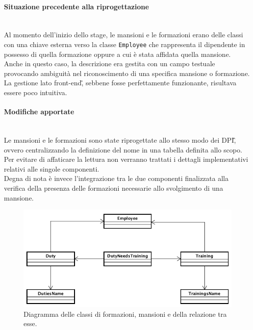 \paragraph*{Situazione precedente alla riprogettazione} \mbox{} \\
	Al momento dell'inizio dello stage, le mansioni e le formazioni erano delle classi con una chiave esterna verso la classe \texttt{Employee} che rappresenta il dipendente in possesso di quella formazione oppure a cui è stata affidata quella mansione.\\
	Anche in questo caso, la descrizione era gestita con un campo testuale provocando ambiguità nel riconoscimento di una specifica mansione o formazione.\\
	La gestione lato \gls{front-end}\G, sebbene fosse perfettamente funzionante, risultava essere poco intuitiva.
	
\paragraph*{Modifiche apportate} \mbox{} \\
Le mansioni e le formazioni sono state riprogettate allo stesso modo dei \gls{DPI}\G, ovvero centralizzando la definizione del nome in una tabella definita allo scopo. \\
Per evitare di affaticare la lettura non verranno trattati i dettagli implementativi relativi alle singole componenti. \\
Degna di nota è invece l'integrazione tra le due componenti finalizzata alla verifica della presenza delle formazioni necessarie allo svolgimento di una mansione. \\

\begin{figure}[H]
	\begin{center}
		\includegraphics[width=12cm]{Pics/UMLClassiFormazioniMansioni.png}
		\caption{Diagramma delle classi di formazioni, mansioni e della relazione tra esse.}
		\label{fig:UMLClassiFormazioniMansioni.png}
	\end{center}
\end{figure}

